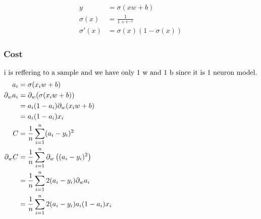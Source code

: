 \documentclass{article}
\begin{document}
\begin{align}
    y &= \sigma(xw + b) \\
    \sigma(x) &= \frac{1}{1 + e^{-x}} \\
    \sigma'(x) &= \sigma(x)(1 - \sigma(x)) 
\end{align}

\subsubsection{Cost}

\def\pd[#1]{\partial_{#1}}
\def\avgsum[#1,#2]{\frac{1}{#2}\sum_{#1=1}^{#2}}

\begin{align}
    \shortintertext{i is reffering to a sample and we have only 1 w and 1 b since it is 1 neuron model.}
    a_i &= \sigma(x_iw +b) \\
    \pd[w]a_i 
        &= \pd[w](\sigma(x_iw + b)) \\
        &= a_i(1 - a_i)\pd[w](x_iw + b) \\
        &= a_i(1 - a_i)x_i \\
    C &= \avgsum[i,n](a_i - y_i)^2 \\
    \pd[w]C 
        &= \avgsum[i, n]\pd[w]\left((a_i - y_i)^2\right) \\
        &= \avgsum[i,n]2(a_i - y_i)\pd[w]a_i \\
        &= \avgsum[i,n]2(a_i - y_i)a_i(1 - a_i)x_i 
\end{align}
\end{document}
